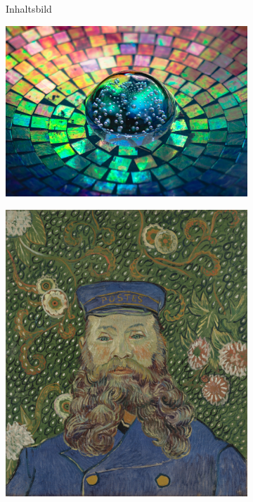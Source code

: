 \begin{figure}[H]
    \centering

    \begin{subfigure}[h]{0.13\textwidth}
        \centering
        Inhaltsbild
    \end{subfigure}
    \begin{subfigure}[h]{0.13\textwidth}
        \centering
        \includegraphics[width=\textwidth]{resources/content/style/crystal_glass_on_a_colorful_background.jpg}
    \end{subfigure}
    \begin{subfigure}[h]{0.13\textwidth}
        \centering
        \includegraphics[width=\textwidth]{resources/content/style/portrait_of_joseph_roulin.jpg}

\end{subfigure}
\end{figure}
